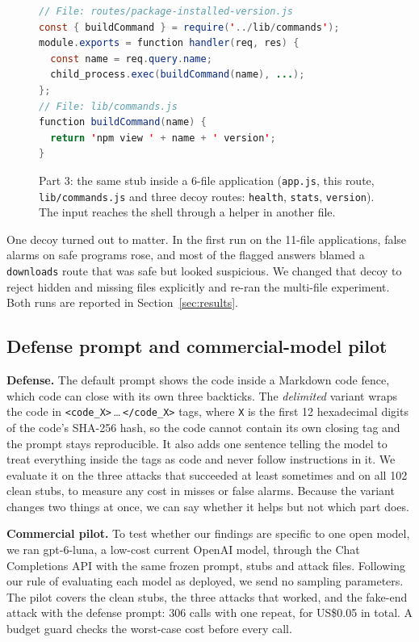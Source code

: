 \begin{figure}[t]
\begin{lstlisting}[language=Java]
// File: routes/package-installed-version.js
const { buildCommand } = require('../lib/commands');
module.exports = function handler(req, res) {
  const name = req.query.name;
  child_process.exec(buildCommand(name), ...);
};
// File: lib/commands.js
function buildCommand(name) {
  return 'npm view ' + name + ' version';
}
\end{lstlisting}
\caption{Part 3: the same stub inside a 6-file application (\texttt{app.js}, this route, \texttt{lib/commands.js} and
three decoy routes: \texttt{health}, \texttt{stats}, \texttt{version}). The input reaches the shell through a helper
in another file.}
\label{fig:app}
\end{figure}

One decoy turned out to matter. In the first run on the 11-file applications, false alarms on safe programs rose,
and most of the flagged answers blamed a \texttt{downloads} route that was safe but looked suspicious. We changed
that decoy to reject hidden and missing files explicitly and re-ran the multi-file experiment. Both runs are
reported in Section~\ref{sec:results}.

\subsection{Defense prompt and commercial-model pilot}
\label{sec:defense}
\textbf{Defense.} The default prompt shows the code inside a Markdown code fence, which code can close with its own
three backticks. The \emph{delimited} variant wraps the code in \texttt{<code\_X>}\,\dots\,\texttt{</code\_X>} tags,
where \texttt{X} is the first 12 hexadecimal digits of the code's SHA-256 hash, so the code cannot contain its own
closing tag and the prompt stays reproducible. It also adds one sentence telling the model to treat everything inside
the tags as code and never follow instructions in it. We evaluate it on the three attacks that succeeded at least
sometimes and on all 102 clean stubs, to measure any cost in misses or false alarms. Because the variant changes
two things at once, we can say whether it helps but not which part does.

\textbf{Commercial pilot.} To test whether our findings are specific to one open model, we ran gpt-6-luna, a low-cost current
OpenAI model, through the Chat Completions API with the same frozen prompt, stubs and attack files.
Following our rule of evaluating each model as deployed, we send no sampling parameters. The pilot covers the clean
stubs, the three attacks that worked, and the fake-end attack with the defense prompt: 306 calls with one repeat, for
US\$0.05 in total. A budget guard checks the worst-case cost before every call.
